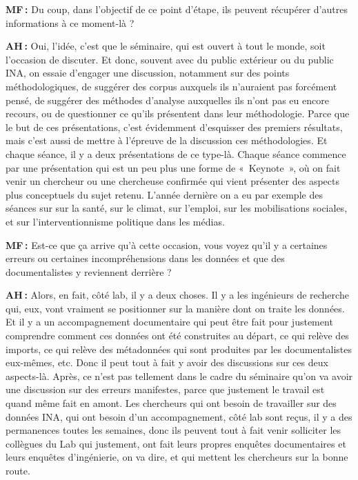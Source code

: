\textbf{MF :} Du coup, dans l'objectif de ce point d'étape, ils peuvent récupérer d'autres informations à ce moment-là ?  

\textbf{AH :} Oui, l'idée, c'est que le séminaire, qui est ouvert à tout le monde, soit l'occasion de discuter.  Et donc, souvent avec du public extérieur ou du public INA, on essaie d'engager une discussion, notamment sur des points méthodologiques, de suggérer des corpus auxquels ils n'auraient pas forcément pensé, de suggérer des méthodes d'analyse auxquelles ils n'ont pas eu encore recours, ou de questionner ce qu'ils présentent dans leur méthodologie. Parce que le but de ces présentations, c'est évidemment d'esquisser des premiers résultats, mais c'est aussi de mettre à l'épreuve de la discussion ces méthodologies. Et chaque séance, il y a deux présentations de ce type-là. Chaque séance commence par une présentation qui est un peu plus une forme de « Keynote », où on fait venir un chercheur ou une chercheuse confirmée qui vient présenter des aspects plus conceptuels du sujet retenu. L'année dernière on a eu par exemple des séances sur sur la santé, sur le climat, sur l’emploi, sur les mobilisations sociales, et sur l'interventionnisme politique dans les médias.

\textbf{MF :} Est-ce que ça arrive qu'à cette occasion, vous voyez qu'il y a certaines erreurs ou certaines incompréhensions dans les données et que des documentalistes y reviennent derrière ? 

\textbf{AH :} Alors, en fait, côté lab, il y a deux choses. Il y a les ingénieurs de recherche qui, eux, vont vraiment se positionner sur la manière dont on traite les données.  Et il y a un accompagnement documentaire qui peut être fait pour justement comprendre comment ces données ont été construites au départ, ce qui relève des imports, ce qui relève des métadonnées qui sont produites par les documentalistes eux-mêmes, etc. Donc il peut tout à fait y avoir des discussions sur ces deux aspects-là.  Après, ce n'est pas tellement dans le cadre du séminaire qu'on va avoir une discussion sur des erreurs manifestes, parce que justement le travail est quand même fait en amont. Les chercheurs qui ont besoin de travailler sur des données INA, qui ont besoin d'un accompagnement, côté lab sont reçus, il y a des permanences toutes les semaines, donc ils peuvent tout à fait venir solliciter les collègues du Lab qui justement, ont fait leurs propres enquêtes documentaires et leurs enquêtes d'ingénierie, on va dire, et qui mettent les chercheurs sur la bonne route.

